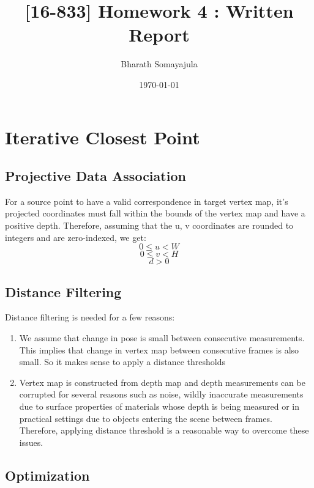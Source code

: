 \documentclass[12pt, a4paper]{article}
\title{[16-833] Homework 4 : Written Report}
\author{Bharath Somayajula}
\date{\today}
\begin{document}
\maketitle

\tableofcontents

\section{Iterative Closest Point}
\subsection{Projective Data Association}
For a source point to have a valid correspondence in target vertex map, it's projected coordinates must fall within the bounds of the vertex map and have a positive depth. Therefore, assuming that the u, v coordinates are rounded to integers and are zero-indexed, we get:
\[0 \leq  u < W\]
\[0 \leq  v < H\]
\[d > 0\]

\subsection{Distance Filtering}
Distance filtering is needed for a few reasons:
\begin{enumerate}
  \item We assume that change in pose is small between consecutive measurements. This implies that change in vertex map between consecutive frames is also small. So it makes sense to apply a distance thresholds
  \item Vertex map is constructed from depth map and depth measurements can be corrupted for several reasons such as noise, wildly inaccurate measurements due to surface properties of materials whose depth is being measured or in practical settings due to objects entering the scene between frames. Therefore, applying distance threshold is a reasonable way to overcome these issues.
\end{enumerate}
\subsection{Optimization}
\end{document}

